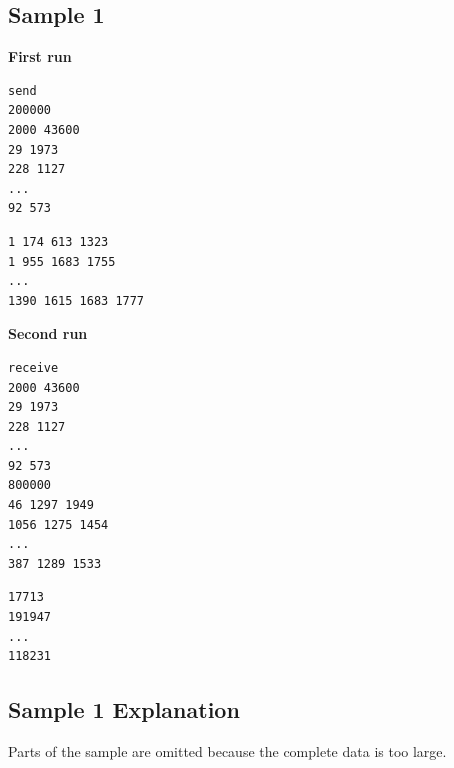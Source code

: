 \subsection{Sample 1}

\textbf{First run}

\begin{minipage}{\linewidth}
	\begin{minipage}[t]{0.49\linewidth}
		\begin{lstlisting}[title=\texttt{standard input}]
send
200000
2000 43600
29 1973
228 1127
...
92 573
\end{lstlisting}
	\end{minipage}
	\begin{minipage}[t]{0.49\linewidth}
		\begin{lstlisting}[title=\texttt{standard output}]
1 174 613 1323
1 955 1683 1755
...
1390 1615 1683 1777
\end{lstlisting}
	\end{minipage}
\end{minipage}

\textbf{Second run}

\begin{minipage}{\linewidth}
	\begin{minipage}[t]{0.49\linewidth}
		\begin{lstlisting}[title=\texttt{standard input}]
receive
2000 43600
29 1973
228 1127
...
92 573
800000
46 1297 1949
1056 1275 1454
...
387 1289 1533
\end{lstlisting}
	\end{minipage}
	\begin{minipage}[t]{0.49\linewidth}
		\begin{lstlisting}[title=\texttt{standard output}]
17713
191947
...
118231
\end{lstlisting}
	\end{minipage}
\end{minipage}


\subsection{Sample 1 Explanation}

Parts of the sample are omitted because the complete data is too large.


